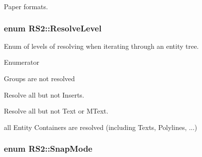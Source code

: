 Paper formats. \hypertarget{classRS2_a1b2c5e3a3e9d1b03a9564229255faa20}{
\subsubsection[{Resolve\-Level}]{\setlength{\rightskip}{0pt plus 5cm}enum {\bf R\-S2\-::\-Resolve\-Level}}}\label{classRS2_a1b2c5e3a3e9d1b03a9564229255faa20}
Enum of levels of resolving when iterating through an entity tree. \begin{Desc}
\item[Enumerator]\par
\begin{description}
\item[{\em 
\hypertarget{classRS2_a1b2c5e3a3e9d1b03a9564229255faa20aecb7396f39bc313ad8903c8a5fac5a50}{Resolve\-None}\label{classRS2_a1b2c5e3a3e9d1b03a9564229255faa20aecb7396f39bc313ad8903c8a5fac5a50}
}]Groups are not resolved \item[{\em 
\hypertarget{classRS2_a1b2c5e3a3e9d1b03a9564229255faa20ac8256a367063261c1a704965599c09a4}{Resolve\-All\-But\-Inserts}\label{classRS2_a1b2c5e3a3e9d1b03a9564229255faa20ac8256a367063261c1a704965599c09a4}
}]Resolve all but not Inserts. \item[{\em 
\hypertarget{classRS2_a1b2c5e3a3e9d1b03a9564229255faa20a3e805b0eaf8fe584c57b2c724f1552fc}{Resolve\-All\-But\-Texts}\label{classRS2_a1b2c5e3a3e9d1b03a9564229255faa20a3e805b0eaf8fe584c57b2c724f1552fc}
}]Resolve all but not Text or M\-Text. \item[{\em 
\hypertarget{classRS2_a1b2c5e3a3e9d1b03a9564229255faa20a2a4a53124bbf724f5f486e1066d99a74}{Resolve\-All}\label{classRS2_a1b2c5e3a3e9d1b03a9564229255faa20a2a4a53124bbf724f5f486e1066d99a74}
}]all Entity Containers are resolved (including Texts, Polylines, ...) \end{description}
\end{Desc}
\hypertarget{classRS2_ad79bb612dc7719b90e79b29298ffaf73}{
\subsubsection[{Snap\-Mode}]{\setlength{\rightskip}{0pt plus 5cm}enum {\bf R\-S2\-::\-Snap\-Mode}}}\label{classRS2_ad79bb612dc7719b90e79b29298ffaf73}

